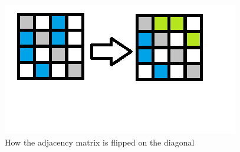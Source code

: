 \begin{figure}
\includegraphics{Figures/flip_matrix}
\caption{How the adjacency matrix is flipped on the diagonal}
\label{fig:flipDiagonal}
\end{figure}